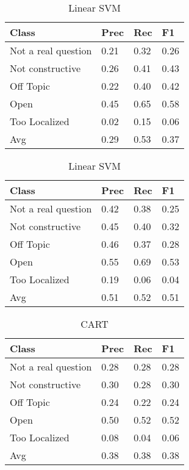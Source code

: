 \begin{table}[!htpb]
\centering
\begin{minipage}{.5\linewidth}
    \begin{tabular}{|l|l|l|l|} \hline
    \textbf{Class}& \textbf{Prec} & \textbf{Rec} & \textbf{F1} \\ \hline
    Not a real question & 0.21      & 0.32   & 0.26     \\
    Not constructive    & 0.26      & 0.41   & 0.43     \\
    Off Topic           & 0.22      & 0.40   & 0.42     \\
    Open                & 0.45      & 0.65   & 0.58     \\
    Too Localized       & 0.02      & 0.15   & 0.06     \\ \hline
    Avg                 & 0.29      & 0.53   & 0.37   \\ \hline  
    \end{tabular}
    \caption{Radial SVM}
    \label{tab:rsvm}
\end{minipage}%
\begin{minipage}{.5\linewidth}
    \begin{tabular}{|l|l|l|l|} \hline
    \textbf{Class}& \textbf{Prec} & \textbf{Rec} & \textbf{F1} \\ \hline
    Not a real question & 0.42      & 0.38   & 0.25     \\
    Not constructive    & 0.45      & 0.40   & 0.32     \\
    Off Topic           & 0.46      & 0.37   & 0.28     \\
    Open                & 0.55      & 0.69   & 0.53     \\
    Too Localized       & 0.19      & 0.06   & 0.04     \\ \hline
    Avg                 & 0.51      & 0.52   & 0.51   \\ \hline  
    \end{tabular}
    \caption{Linear SVM}
    \label{tab:lsvm}
\end{minipage}

\end{table}

\begin{table}[!htpb]
\centering
\begin{tabular}{|l|l|l|l|} \hline
\textbf{Class}& \textbf{Prec} & \textbf{Rec} & \textbf{F1} \\ \hline
Not a real question & 0.28      & 0.28   & 0.28     \\
Not constructive    & 0.30      & 0.28   & 0.30     \\
Off Topic           & 0.24      & 0.22   & 0.24     \\
Open                & 0.50      & 0.52   & 0.52     \\
Too Localized       & 0.08      & 0.04   & 0.06     \\ \hline
Avg                 & 0.38      & 0.38   & 0.38   \\ \hline  
\end{tabular}
\caption{CART}
\label{tab:cart}
\end{table}



